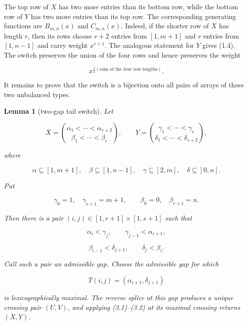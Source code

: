 \documentclass[11pt]{article}
\newtheorem{lemma}[theorem]{Lemma}
\numberwithin{equation}{section}
\begin{document}
The top row of $X$ has two more entries than its bottom row, while the bottom row
of $Y$ has two more entries than its top row. The corresponding generating
functions are $B_{m,n}(x)$ and $C_{m,n}(x)$. Indeed, if the shorter row of $X$
has length $r$, then its rows choose $r+2$ entries from $[1,m+1]$ and $r$ entries
from $[1,n-1]$ and carry weight $x^{r+1}$. The analogous statement for $Y$
gives (1.4). The switch preserves the union of the four rows and hence preserves
the weight

\nopagebreak[4]
\[
x^{\frac12(\text{sum of the four row lengths})}.
\]

It remains to prove that the switch is a bijection onto all pairs of arrays of
these two unbalanced types.

\Needspace{0.30\textheight}
\begin{lemma}[two-gap tail switch]

Let

\nopagebreak[4]
\[
X=\binom{\alpha_1<\cdots<\alpha_{r+2}}
          {\beta_1<\cdots<\beta_r},
\qquad
Y=\binom{\gamma_1<\cdots<\gamma_s}
          {\delta_1<\cdots<\delta_{s+2}},
\tag{3.3}
\]

where

\nopagebreak[4]
\[
\alpha\subseteq[1,m+1],\quad \beta\subseteq[1,n-1],\quad
\gamma\subseteq[2,m],\quad \delta\subseteq[0,n].
\]

Put

\nopagebreak[4]
\[
\gamma_0=1,\quad \gamma_{s+1}=m+1,
\qquad
\beta_0=0,\quad \beta_{r+1}=n.
\]

Then there is a pair $(i,j)\in[1,r+1]\times[1,s+1]$ such that

\nopagebreak[4]
\[
\alpha_i<\gamma_j,\qquad \gamma_{j-1}<\alpha_{i+1},
\tag{3.4}
\]

\nopagebreak[4]
\[
\beta_{i-1}<\delta_{j+1},\qquad \delta_j<\beta_i.
\tag{3.5}
\]

Call such a pair an admissible gap. Choose the admissible gap for which

\nopagebreak[4]
\[
T(i,j)=(\alpha_{i+1},\delta_{j+1})
\]

is lexicographically maximal. The reverse splice at this gap produces a unique
crossing pair $(U,V)$, and applying (3.1)--(3.2) at its maximal crossing returns
$(X,Y)$.

\end{lemma}
\end{document}
